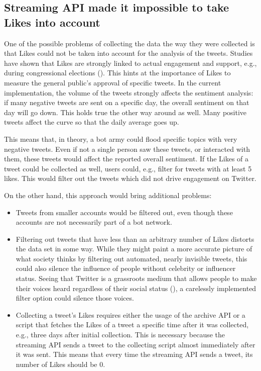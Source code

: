 \subsection*{Streaming API made it impossible to take Likes into account}
One of the possible problems of collecting the data the way they were collected is that Likes could not be taken into account for the analysis of the tweets. Studies have shown that Likes are strongly linked to actual engagement and support, e.g., during congressional elections (\cite{macwilliamsForecastingCongressionalElections2015}). This hints at the importance of Likes to measure the general public's approval of specific tweets. In the current implementation, the volume of the tweets strongly affects the sentiment analysis: if many negative tweets are sent on a specific day, the overall sentiment on that day will go down. This holds true the other way around as well. Many positive tweets affect the curve so that the daily average goes up.

This means that, in theory, a bot army could flood specific topics with very negative tweets. Even if not a single person saw these tweets, or interacted with them, these tweets would affect the reported overall sentiment. If the Likes of a tweet could be collected as well, users could, e.g., filter for tweets with at least 5 likes. This would filter out the tweets which did not drive engagement on Twitter.

On the other hand, this approach would bring additional problems:
\begin{itemize}
    \item Tweets from smaller accounts would be filtered out, even though these accounts are not necessarily part of a bot network.
    \item Filtering out tweets that have less than an arbitrary number of Likes distorts the data set in some way. While they might paint a more accurate picture of what society thinks by filtering out automated, nearly invisible tweets, this could also silence the influence of people without celebrity or influencer status. Seeing that Twitter is a grassroots medium that allows people to make their voices heard regardless of their social status (\cite{passmann2019alte}), a carelessly implemented filter option could silence those voices.
    \item Collecting a tweet's Likes requires either the usage of the archive API or a script that fetches the Likes of a tweet a specific time after it was collected, e.g., three days after initial collection. This is necessary because the streaming API sends a tweet to the collecting script almost immediately after it was sent. This means that every time the streaming API sends a tweet, its number of Likes should be 0.
\end{itemize}


